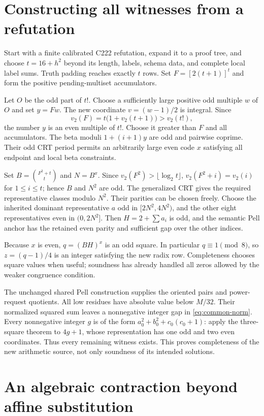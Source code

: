 \documentclass[11pt]{article}
\theoremstyle{remark}\newtheorem{remark}[theorem]{Remark}
\begin{document}
\section{Constructing all witnesses from a refutation}

Start with a finite calibrated C222 refutation, expand it to a proof
tree, and choose $t=16+h^2$ beyond its length, labels, schema data,
and complete local label sums. Truth padding reaches exactly $t$ rows.
Set $F=[2(t+1)]^t$ and form the positive pending-multiset accumulators.

Let $O$ be the odd part of $t!$. Choose a sufficiently large positive
odd multiple $w$ of $O$ and set $y=Fw$. The new coordinate
$v=(w-1)/2$ is integral. Since
\[
 v_2(F)=t\bigl(1+v_2(t+1)\bigr)>v_2(t!),
\]
the number $y$ is an even multiple of $t!$. Choose it greater than
$F$ and all accumulators. The beta moduli $1+(i+1)y$ are odd and
pairwise coprime. Their odd CRT period permits an arbitrarily large
even code $x$ satisfying all endpoint and local beta constraints.

Set $B=\binom{F^2+t}{t}$ and $N=B^x$. Since
$v_2(F^2)>\lfloor\log_2t\rfloor$,
$v_2(F^2+i)=v_2(i)$ for $1\le i\le t$; hence $B$ and $N^2$ are odd.
The generalized CRT gives the required representative classes modulo
$N^2$. Their parities can be chosen freely. Choose the inherited
dominant representative $a$ odd in $[2N^2,4N^2)$, and the other eight
representatives even in $(0,2N^2]$. Then $H=2+\sum a_i$ is odd,
and the semantic Pell anchor has the retained even parity and sufficient
gap over the other indices.

Because $x$ is even, $q=(BH)^x$ is an odd square. In particular
$q\equiv1\pmod8$, so $z=(q-1)/4$ is an integer satisfying the new
radix row. Completeness chooses square values when useful; soundness
has already handled all zeros allowed by the weaker congruence condition.

The unchanged shared Pell construction supplies the oriented pairs and
power-request quotients. All low residues have absolute value below
$M/32$. Their normalized squared sum leaves a nonnegative integer
gap in \eqref{eq:common-norm}. Every nonnegative integer $g$ is of
the form $a_0^2+b_0^2+c_0(c_0+1)$: apply the three-square theorem
to $4g+1$, whose representation has one odd and two even coordinates.
Thus every remaining witness exists. This proves completeness of the
new arithmetic source, not only soundness of its intended solutions.

\section{An algebraic contraction beyond affine substitution}
\end{document}
